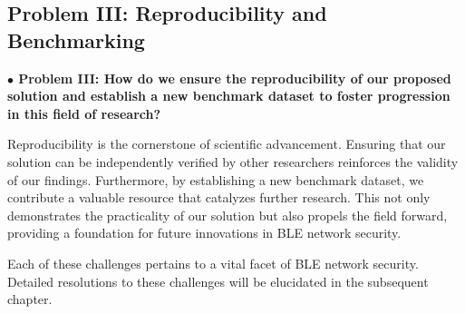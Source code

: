 \subsection{Problem III: Reproducibility and Benchmarking}

\noindent \textbf{$\bullet$ Problem III: How do we ensure the reproducibility of our proposed solution and establish a new benchmark dataset to foster progression in this field of research?}

Reproducibility is the cornerstone of scientific advancement. Ensuring that our solution can be independently verified by other researchers reinforces the validity of our findings. Furthermore, by establishing a new benchmark dataset, we contribute a valuable resource that catalyzes further research. This not only demonstrates the practicality of our solution but also propels the field forward, providing a foundation for future innovations in BLE network security.

\vspace{10pt}

Each of these challenges pertains to a vital facet of BLE network security. Detailed resolutions to these challenges will be elucidated in the subsequent chapter.

\newpage